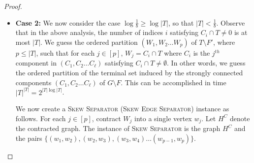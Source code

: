 \documentclass[11pt]{article}
\newcommand{\OO}{\mathcal{O}}
\newcommand{\SMC}{{\textsc{Skew Separator}}}
\newcommand{\SMCE}{{\textsc{Skew Edge Separator}}}
\begin{document}
{\begin{proof}
\begin{itemize}
For each terminal $t \in T$, we guess if $t \in F$, and if not, we guess $i$ such that $t \in \bigcup_{j = l_i}^{r_i} C_j$. We also guess if $t \in C_{r_i}$. All these guesses together take time $2^{\OO(|T|\log\frac{1}{b})}$.

We now create a \SMC{} (\SMCE{}) instance as follows. Let $T_{i1} = ((\bigcup_{j = l_i}^{r_i} C_j) \setminus C_{r_i}) \cap T$ and $T_{i2} = C_{r_i} \cap T$ for each $i \in [\ell]$. Observe that by construction, for any $i \in [\ell]$, both $T_{i1}$ and $T_{i2}$ have at most $(b + \epsilon)|T|$ terminals. Next, contract  $T_{i1}$ into a single vertex $t_{i1}$, and contract  $T_{i2}$ into a single vertex $t_{i2}$. Let $G^C$ denote the contracted graph. The instance of \SMC{} is the graph $G^C$ and the pairs $\{(t_{11}, t_{12}), (t_{12}, t_{21}), (t_{21}, t_{22}) \ldots (t_{\ell 1}, t_{\ell 2})\}$. (If some $T_{i1} = \emptyset$, we replace the pairs $(t_{{i-1},2}, t_{i1}), (t_{i1}, t_{i2})$ by the single pair $(t_{{i-1},2}, t_{i2})$, we omit this detail.)

\SMC{} (\SMCE{}) then returns a set of vertices (arcs) $F'$ with $|F'| \leq k$, so that in $G \setminus F'$, there is no path from $t_{c_1d_1} \rightarrow t_{c_2d_2}$ whenever $c_2 \leq c_1$ or when $c_2 = c_1$ and $d_2 \leq d_1$, for $c_1,c_2 \in [\ell]$ and $d_1,d_2 \in \{1,2\}$. In particular, this means that no strongly connected component of $G \setminus F'$ has more than $(b + \epsilon)|T|$ terminals, since for any $c \in [\ell]$ and $d \in \{1,2\}$, $|T_{cd}| \leq (b + \epsilon)|T|$.

\item \textbf{Case 2:} We now consider the case $\log \frac{1}{b} \geq \log |T|$, so that $|T| < \frac{1}{b}$. Observe that in the above analysis, the number of indices $i$ satisfying $C_i \cap T \neq 0$ is at most $|T|$. We guess the ordered partition $(W_1, W_2 \ldots W_{p})$ of $T \setminus F'$, where $p \leq |T|$, such that for each $j \in [p]$, $W_j = C_i \cap T$ where $C_i$ is the $j^{th}$ component in $(C_1, C_2 \ldots C_{\ell})$ satisfying $C_i \cap T \neq \emptyset$. In other words, we guess the ordered
partition of the terminal set induced by the strongly connected components $(C_1, C_2 \ldots C_{\ell})$ of $G \setminus F$. This can be accomplished in time $|T|^{|T|} = 2^{|T| \log |T|}$. 

We now create a \SMC{} (\SMCE{}) instance as follows. For each $j \in [p]$, contract  $W_{j}$ into a single vertex $w_{j}$. Let $H^C$ denote the contracted graph. The instance of \SMC{} is the graph $H^C$ and the pairs $\{(w_{1}, w_{2}), (w_{2}, w_{3}), (w_{3}, w_{4}) \ldots (w_{p-1}, w_{p})\}$. 


\end{itemize}
\end{proof}}
\end{document}
